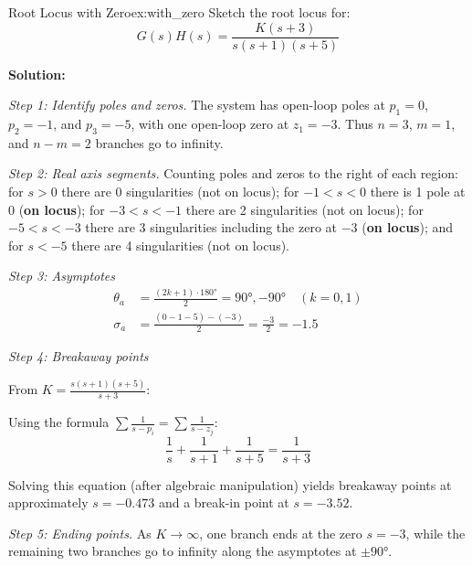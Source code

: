 \begin{example}{Root Locus with Zero}{ex:with_zero}
Sketch the root locus for:
\[
G(s)H(s) = \frac{K(s+3)}{s(s+1)(s+5)}
\]

\textbf{Solution:}

\textit{Step 1: Identify poles and zeros.} The system has open-loop poles at $p_1 = 0$, $p_2 = -1$, and $p_3 = -5$, with one open-loop zero at $z_1 = -3$. Thus $n = 3$, $m = 1$, and $n - m = 2$ branches go to infinity.

\textit{Step 2: Real axis segments.} Counting poles and zeros to the right of each region: for $s > 0$ there are 0 singularities (not on locus); for $-1 < s < 0$ there is 1 pole at 0 (\textbf{on locus}); for $-3 < s < -1$ there are 2 singularities (not on locus); for $-5 < s < -3$ there are 3 singularities including the zero at $-3$ (\textbf{on locus}); and for $s < -5$ there are 4 singularities (not on locus).

\textit{Step 3: Asymptotes}
\begin{align*}
\theta_a &= \frac{(2k+1) \cdot 180°}{2} = 90°, -90° \quad (k = 0, 1)\\
\sigma_a &= \frac{(0 - 1 - 5) - (-3)}{2} = \frac{-3}{2} = -1.5
\end{align*}

\textit{Step 4: Breakaway points}

From $K = \frac{s(s+1)(s+5)}{s+3}$:

Using the formula $\sum \frac{1}{s-p_i} = \sum \frac{1}{s-z_j}$:
\[
\frac{1}{s} + \frac{1}{s+1} + \frac{1}{s+5} = \frac{1}{s+3}
\]

Solving this equation (after algebraic manipulation) yields breakaway points at approximately $s = -0.473$ and a break-in point at $s = -3.52$.

\textit{Step 5: Ending points.} As $K \to \infty$, one branch ends at the zero $s = -3$, while the remaining two branches go to infinity along the asymptotes at $\pm 90°$.

\begin{figure}[H]
\centering
{}
\end{figure}
\end{example}
